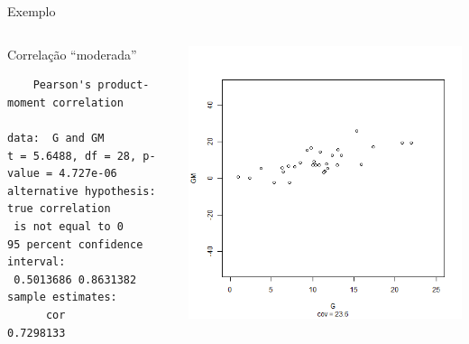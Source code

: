 \documentclass{beamer}
\begin{document}
\begin{frame}[fragile]{\scriptsize Exemplo}
  \begin{columns}
    \begin{column}{6cm}
      \begin{exampleblock}{Correlação ``moderada''}
        \tiny
\begin{verbatim}
	Pearson's product-moment correlation

data:  G and GM
t = 5.6488, df = 28, p-value = 4.727e-06
alternative hypothesis: true correlation
 is not equal to 0
95 percent confidence interval:
 0.5013686 0.8631382
sample estimates:
      cor 
0.7298133
\end{verbatim}
    \end{exampleblock}
   \end{column}
    \begin{column}{4cm}
  \begin{center}
    \includegraphics[height=.8\textheight]{Cap17/anim-2}
  \end{center}
    \end{column}
\end{columns}
\end{frame}
\end{document}
